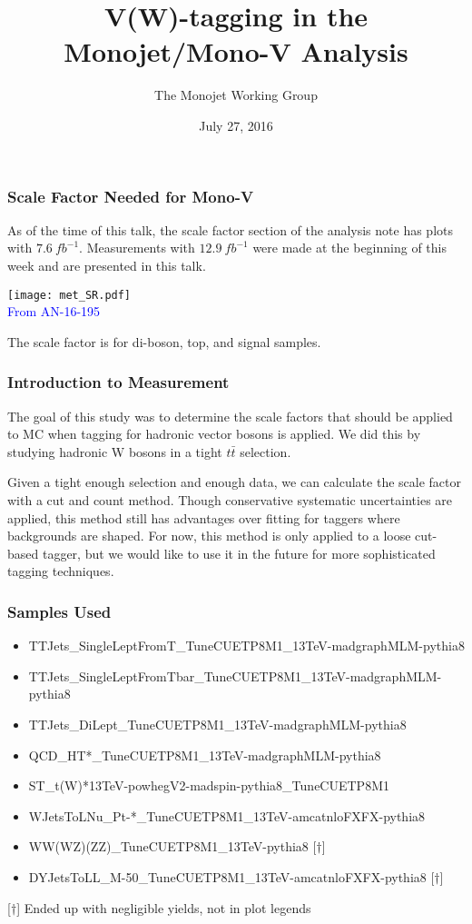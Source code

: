 \documentclass{beamer}
\author[D. Abercrombie]{
  The Monojet Working Group
}
\title{\bf \sffamily V(W)-tagging in the Monojet/Mono-V Analysis}
\date{July 27, 2016}
\begin{document}
\begin{frame}[nonumbering]
  \titlepage
\end{frame}

\begin{frame}
  \frametitle{Scale Factor Needed for Mono-V}
  As of the time of this talk, the scale factor section of the analysis note
  has plots with $\SI{7.6}{fb^{-1}}$.
  Measurements with $\SI{12.9}{fb^{-1}}$ were made at the beginning of this week
  and are presented in this talk.

  \begin{center}
    \texttt{[image: met\_SR.pdf]} \\
    \textcolor{blue}{From AN-16-195}
  \end{center}

  The scale factor is for di-boson, top, and signal samples.
\end{frame}

\begin{frame}
  \frametitle{Introduction to Measurement}
  The goal of this study was to determine the scale factors that should
  be applied to MC when tagging for hadronic vector bosons is applied.
  We did this by studying hadronic W bosons in a tight $t\bar{t}$ selection.

  \vspace{12pt}

  Given a tight enough selection and enough data, we can calculate the 
  scale factor with a cut and count method.
  Though conservative systematic uncertainties are applied, this method still has advantages
  over fitting for taggers where backgrounds are shaped.
  For now, this method is only applied to a loose cut-based tagger,
  but we would like to use it in the future for more sophisticated tagging techniques.
\end{frame}

\begin{frame}
  \frametitle{Samples Used}
  {\scriptsize
  \begin{itemize}
  \item TTJets\_SingleLeptFromT\_TuneCUETP8M1\_13TeV-madgraphMLM-pythia8
  \item TTJets\_SingleLeptFromTbar\_TuneCUETP8M1\_13TeV-madgraphMLM-pythia8
  \item TTJets\_DiLept\_TuneCUETP8M1\_13TeV-madgraphMLM-pythia8
  \item QCD\_HT*\_TuneCUETP8M1\_13TeV-madgraphMLM-pythia8
  \item ST\_t(W)*13TeV-powhegV2-madspin-pythia8\_TuneCUETP8M1
  \item WJetsToLNu\_Pt-*\_TuneCUETP8M1\_13TeV-amcatnloFXFX-pythia8
  \item WW(WZ)(ZZ)\_TuneCUETP8M1\_13TeV-pythia8 [$\dagger$]
  \item DYJetsToLL\_M-50\_TuneCUETP8M1\_13TeV-amcatnloFXFX-pythia8 [$\dagger$]
  \end{itemize}
  [$\dagger$] Ended up with negligible yields, not in plot legends
  }
\end{frame}
\end{document}
